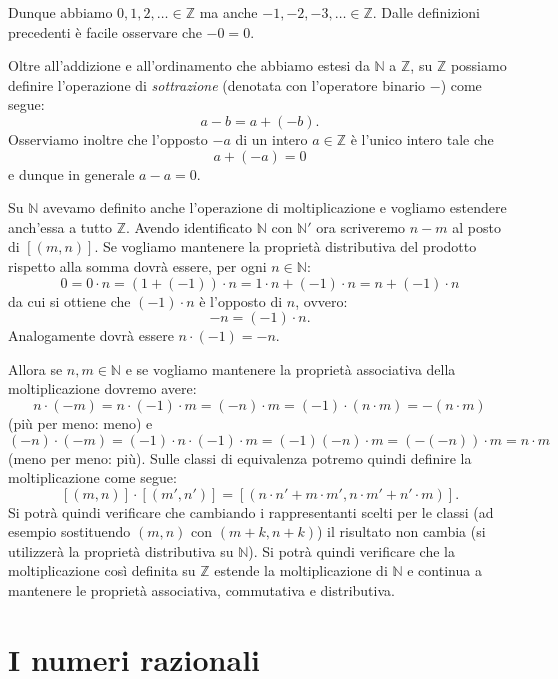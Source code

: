\documentclass[italian,a4paper,hidelinks,headinclude]{scrartcl}
\newcommand{\NN}{{\mathbb N}}
\newcommand{\ZZ}{{\mathbb Z}}
\begin{document}
Dunque abbiamo $0,1,2,\dots \in \ZZ$ ma anche $-1,-2,-3, \dots \in \ZZ$.
Dalle definizioni precedenti è facile osservare che $-0=0$.

Oltre all'addizione e all'ordinamento che abbiamo estesi da $\NN$ a $\ZZ$,
su $\ZZ$ possiamo definire l'operazione di \emph{sottrazione} (denotata con
l'operatore binario $-$) come segue:
\[
  a-b = a + (-b).
\]
Osserviamo inoltre che l'opposto $-a$ di un intero $a\in \ZZ$ è l'unico
intero tale che
\[
  a + (-a) = 0
\]
e dunque in generale $a-a=0$.

Su $\NN$ avevamo definito anche l'operazione di moltiplicazione e vogliamo
estendere anch'essa a tutto $\ZZ$.
Avendo identificato $\NN$ con $\NN'$ ora scriveremo $n-m$ al posto di $[(m,n)]$.
Se vogliamo mantenere la proprietà distributiva del prodotto rispetto alla somma
dovrà essere, per ogni $n\in \NN$:
\[
  0 = 0\cdot n = (1+(-1))\cdot n = 1\cdot n + (-1)\cdot n
   = n + (-1)\cdot n
\]
da cui si ottiene che $(-1)\cdot n$ è l'opposto di $n$, ovvero:
\[
  -n = (-1)\cdot n.
\]
Analogamente dovrà essere $n\cdot (-1) = -n$.

Allora se $n,m\in \NN$ e se vogliamo mantenere la proprietà associativa
della moltiplicazione dovremo avere:
\[
  n \cdot (-m) = n \cdot (-1) \cdot m = (-n)\cdot m = (-1)\cdot (n\cdot m)
   = -(n\cdot m)
\]
(più per meno: meno)
e
\[
(-n)\cdot(-m) = (-1) \cdot n \cdot (-1) \cdot m = (-1)(-n)\cdot m
 = (-(-n))\cdot m = n\cdot m
\]
(meno per meno: più).
Sulle classi di equivalenza potremo quindi definire
la moltiplicazione come segue:
\[
[(m,n)]\cdot [(m',n')] = [(n\cdot n' + m\cdot m',n\cdot m' + n'\cdot m)].
\]
Si potrà quindi verificare che cambiando i rappresentanti scelti per le
classi (ad esempio sostituendo $(m,n)$ con $(m+k,n+k)$) il risultato non
cambia (si utilizzerà la proprietà distributiva su $\NN$).
Si potrà quindi verificare che la moltiplicazione così definita su $\ZZ$
estende la moltiplicazione di $\NN$ e continua a mantenere le proprietà associativa,
commutativa e distributiva.

\section{I numeri razionali}
\end{document}
